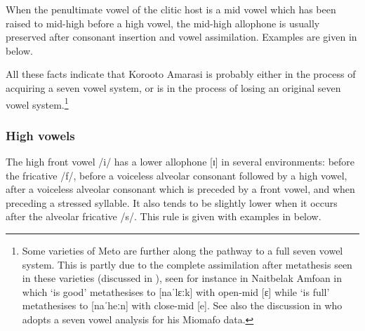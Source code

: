 When the penultimate vowel of the clitic host
is a mid vowel which has been raised to mid-high before a high vowel,
the mid-high allophone is usually preserved after consonant insertion and vowel assimilation.
Examples are given in  below.

\begin{exe}
\end{exe}

All these facts indicate that Koro{\Q}oto Amarasi is probably either in the process of acquiring
a seven vowel system, or is in the process of losing an original seven vowel system.\footnote{
		Some varieties of Meto are further along the pathway to a full seven vowel system.
		This is partly due to the complete assimilation after
		metathesis seen in these varieties (discussed in ),
		seen for instance in Naitbelak Amfo{\Q}an in which  `is good'
		metathesises to [naˈlɛːk] with open-mid [ɛ]
		while  `is full' metathesises to [naˈheːn] with close-mid [e].
		See also the discussion in \citet{st93,st96,st96b,st08}
		who adopts a seven vowel analysis for his Miomafo data.}

\subsubsection{High vowels}
The high front vowel /i/ has a lower allophone [ɪ] in several environments:
before the fricative /f/, before a voiceless alveolar consonant followed by a high vowel,
after a voiceless alveolar consonant which is preceded by a front vowel,
and when preceding a stressed syllable.
It also tends to be slightly lower when it occurs after the alveolar fricative /s/.
This rule is given with examples in  below.

